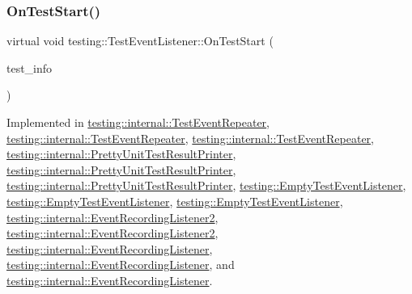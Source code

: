 \subsubsection{\texorpdfstring{OnTestStart()}{OnTestStart()}\hspace{0.1cm}{\footnotesize\ttfamily [2/3]}}
{\footnotesize\ttfamily virtual void testing\+::\+Test\+Event\+Listener\+::\+On\+Test\+Start (\begin{DoxyParamCaption}\item[{const \mbox{\hyperlink{classtesting_1_1_test_info}{Test\+Info}} \&}]{test\+\_\+info }\end{DoxyParamCaption})\hspace{0.3cm}{\ttfamily [pure virtual]}}



Implemented in \mbox{\hyperlink{classtesting_1_1internal_1_1_test_event_repeater_a4522c01f10f98d9e5bd97c7e94f3d2bf}{testing\+::internal\+::\+Test\+Event\+Repeater}}, \mbox{\hyperlink{classtesting_1_1internal_1_1_test_event_repeater_a4522c01f10f98d9e5bd97c7e94f3d2bf}{testing\+::internal\+::\+Test\+Event\+Repeater}}, \mbox{\hyperlink{classtesting_1_1internal_1_1_test_event_repeater_a70d694ca5010cc86cd458f7f529e6fbe}{testing\+::internal\+::\+Test\+Event\+Repeater}}, \mbox{\hyperlink{classtesting_1_1internal_1_1_pretty_unit_test_result_printer_a079ac0eb5f8cdd2511cfd33ef931338b}{testing\+::internal\+::\+Pretty\+Unit\+Test\+Result\+Printer}}, \mbox{\hyperlink{classtesting_1_1internal_1_1_pretty_unit_test_result_printer_a079ac0eb5f8cdd2511cfd33ef931338b}{testing\+::internal\+::\+Pretty\+Unit\+Test\+Result\+Printer}}, \mbox{\hyperlink{classtesting_1_1internal_1_1_pretty_unit_test_result_printer_a8133130bf8254da0a78e39ac34155410}{testing\+::internal\+::\+Pretty\+Unit\+Test\+Result\+Printer}}, \mbox{\hyperlink{classtesting_1_1_empty_test_event_listener_a1d8c7f3f1f92826f668edae1bc5aadf4}{testing\+::\+Empty\+Test\+Event\+Listener}}, \mbox{\hyperlink{classtesting_1_1_empty_test_event_listener_a1d8c7f3f1f92826f668edae1bc5aadf4}{testing\+::\+Empty\+Test\+Event\+Listener}}, \mbox{\hyperlink{classtesting_1_1_empty_test_event_listener_a84fa74cc9ba742f9f847ea405ca84e5e}{testing\+::\+Empty\+Test\+Event\+Listener}}, \mbox{\hyperlink{classtesting_1_1internal_1_1_event_recording_listener2_ac3231fff64b23bbd05e3a2cc57e20df9}{testing\+::internal\+::\+Event\+Recording\+Listener2}}, \mbox{\hyperlink{classtesting_1_1internal_1_1_event_recording_listener2_ac3231fff64b23bbd05e3a2cc57e20df9}{testing\+::internal\+::\+Event\+Recording\+Listener2}}, \mbox{\hyperlink{classtesting_1_1internal_1_1_event_recording_listener_ad850af9e4276b9bfba61435b97a02094}{testing\+::internal\+::\+Event\+Recording\+Listener}}, \mbox{\hyperlink{classtesting_1_1internal_1_1_event_recording_listener_ad850af9e4276b9bfba61435b97a02094}{testing\+::internal\+::\+Event\+Recording\+Listener}}, and \mbox{\hyperlink{classtesting_1_1internal_1_1_event_recording_listener_aebd488b780fc172d6058ca07ca8f7145}{testing\+::internal\+::\+Event\+Recording\+Listener}}.

